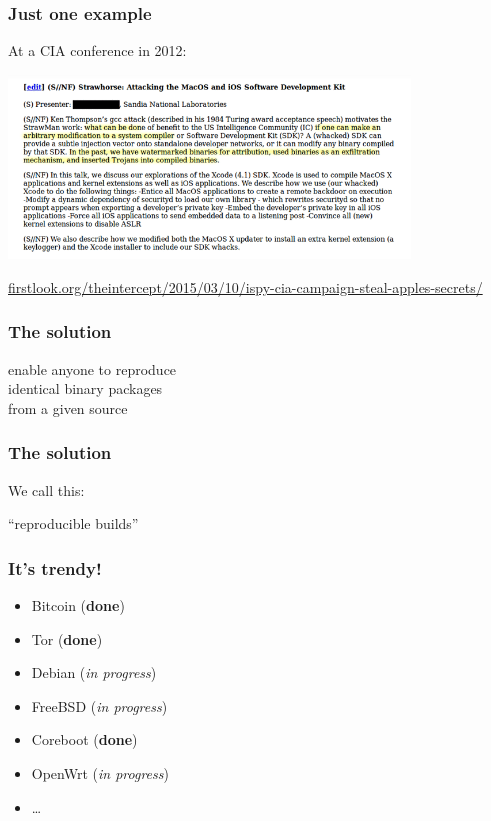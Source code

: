 \documentclass[14pt,aspectratio=169]{beamer}
\begin{document}
\begin{frame}[fragile]
\frametitle{Just one example}

At a CIA conference in 2012:

\begin{center}
\includegraphics[width=0.8\textwidth]{images/strawhorse.png}

{\footnotesize 
\url{firstlook.org/theintercept/2015/03/10/ispy-cia-campaign-steal-apples-secrets/}
}
\end{center}

\end{frame}

\begin{frame}
\frametitle{The solution}

\begin{center}
\Large
enable anyone to reproduce\\
identical binary packages\\
from a given source
\end{center}

\end{frame}

\begin{frame}
\frametitle{The solution}

\begin{center}
We call this:

\Huge
“reproducible builds”
\end{center}

\end{frame}

\begin{frame}
\frametitle{It's trendy!}

\begin{itemize}
\item Bitcoin (\textbf{done})
\item Tor (\textbf{done})
\item Debian (\emph{in progress})
\item FreeBSD (\emph{in progress})
\item Coreboot (\textbf{done})
\item OpenWrt (\emph{in progress})
\item \ldots{}
\end{itemize}

\end{frame}
\end{document}
